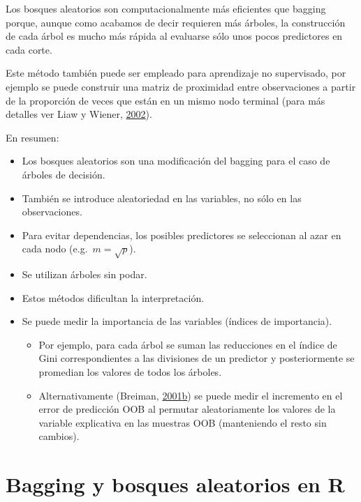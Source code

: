\documentclass[
  spanish,
]{book}
\theoremstyle{break}
\theoremstyle{definition}
\theoremstyle{definition}
\theoremstyle{definition}
\theoremstyle{remark}
\begin{document}
Los bosques aleatorios son computacionalmente más eficientes que bagging porque, aunque como acabamos de decir requieren más árboles, la construcción de cada árbol es mucho más rápida al evaluarse sólo unos pocos predictores en cada corte.

Este método también puede ser empleado para aprendizaje no supervisado,
por ejemplo se puede construir una matriz de proximidad entre observaciones a partir de la proporción de veces que están en un mismo nodo terminal (para más detalles ver Liaw y Wiener, \protect\hyperlink{ref-liaw2002classification}{2002}).

En resumen:

\begin{itemize}
\item
  Los bosques aleatorios son una modificación del bagging para el caso de árboles de decisión.
\item
  También se introduce aleatoriedad en las variables, no sólo en las observaciones.
\item
  Para evitar dependencias, los posibles predictores se seleccionan al azar en cada nodo (e.g.~\(m=\sqrt{p}\)).
\item
  Se utilizan árboles sin podar.
\item
  Estos métodos dificultan la interpretación.
\item
  Se puede medir la importancia de las variables (índices de importancia).

  \begin{itemize}
  \item
    Por ejemplo, para cada árbol se suman las reducciones en el
    índice de Gini correspondientes a las divisiones de un
    predictor y posteriormente se promedian los valores de todos
    los árboles.
  \item
    Alternativamente (Breiman, \protect\hyperlink{ref-breiman2001statistical}{2001}\protect\hyperlink{ref-breiman2001statistical}{b}) se puede medir el incremento en el error de
    predicción OOB al permutar aleatoriamente los valores de la
    variable explicativa en las muestras OOB (manteniendo el resto
    sin cambios).
  \end{itemize}
\end{itemize}

\hypertarget{bagging-rf-r}{%
\section{Bagging y bosques aleatorios en R}\label{bagging-rf-r}}
\end{document}
